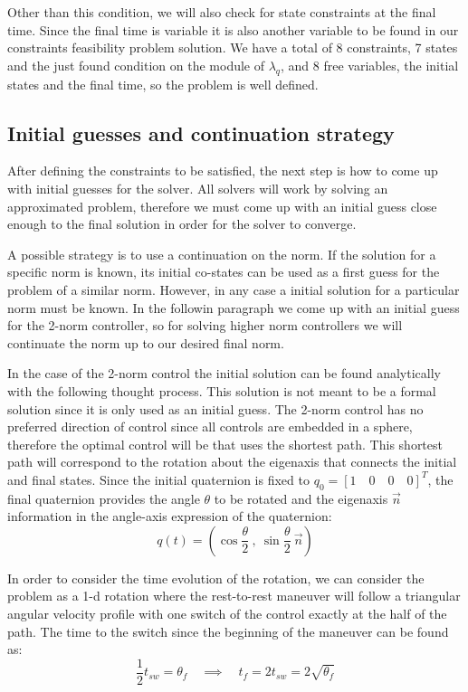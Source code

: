 Other than this condition, we will also check for state constraints at the final time. Since the final time is variable it is also another variable to be found in our constraints feasibility problem solution. We have a total of 8 constraints, 7 states and the just found condition on the module of $\lambda_q$, and 8 free variables, the initial states and the final time, so the problem is well defined.

\subsection{Initial guesses and continuation strategy}
After defining the constraints to be satisfied, the next step is how to come up with initial guesses for the solver. All solvers will work by solving an approximated problem, therefore we must come up with an initial guess close enough to the final solution in order for the solver to converge.

A possible strategy is to use a continuation on the norm. If the solution for a specific norm is known, its initial co-states can be used as a first guess for the problem of a similar norm. However, in any case a initial solution for a particular norm must be known. In the followin paragraph we come up with an initial guess for the 2-norm controller, so for solving higher norm controllers we will continuate the norm up to our desired final norm.

In the case of the 2-norm control the initial solution can be found analytically with the following thought process. This solution is not meant to be a formal solution since it is only used as an initial guess. The 2-norm control has no preferred direction of control since all controls are embedded in a sphere, therefore the optimal control will be that uses the shortest path. This shortest path will correspond to the rotation about the eigenaxis that connects the initial and final states. Since the initial quaternion is fixed to $q_0=[1 \quad 0 \quad 0 \quad 0]^T$, the final quaternion provides the angle $\theta$ to be rotated and the eigenaxis $\vec{n}$ information in the angle-axis expression of the quaternion:
\begin{equation}
q(t) = \left( \cos \frac{\theta}{2} \ ,\ \sin\frac{\theta}{2} \ \vec{n} \right)
\end{equation}

In order to consider the time evolution of the rotation, we can consider the problem as a 1-d rotation where the rest-to-rest maneuver will follow a triangular angular velocity profile with one switch of the control exactly at the half of the path. The time to the switch since the beginning of the maneuver can be found as:
\begin{equation}
  \frac{1}{2} t_{sw} = \theta_f \quad \implies \quad t_f=2 t_{sw} = 2 \sqrt{\theta_f}
\end{equation}

